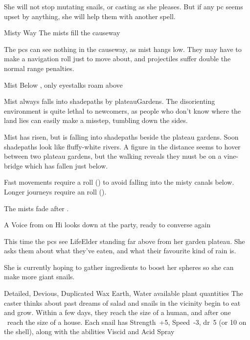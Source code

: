 She will not stop mutating snails, or \gls{casting} as she pleases.
But if any \gls{pc} seems upset by anything, she will help them with another spell.

\LifeElder

\showStdSpells

{Misty Way}%
{The mists fill the causeway}%

The \glspl{pc} can see nothing in the causeway, as mist hangs low.
They may have to make a navigation roll just to move about, and projectiles suffer double the normal range penalties.

{Mist Below}%
{, only eyestalks roam above}%

Mist always falls into \gls{shadepaths} by \gls{plateauGardens}.
The disorienting environment is quite lethal to newcomers, as people who don't know where the land lies can easily make a misstep, tumbling down the sides.

\begin{boxtext}
  Mist has risen, but is falling into \gls{shadepaths} beside the plateau gardens.
  Soon \gls{shadepaths} look like fluffy-white rivers.
  A figure in the distance seems to hover between two plateau gardens, but the walking reveals they must be on a vine-bridge which has fallen just below.
\end{boxtext}

Fast movements require a  roll (\tn[8]) to avoid falling into the misty canals below.
Longer journeys require an  roll (\tn[10]).

The mists fade after .

{A Voice from on Hi}%
{ looks down at the party, ready to converse again}%

This time the \glspl{pc} see \gls{LifeElder} standing far above from her garden plateau.
She asks them about what they've eaten, and what their favourite kind of rain is.

She is currently hoping to gather \glspl{ingredient} to boost her \glspl{sphere} so she can make more giant snails.

  {Detailed, Devious, Duplicated}%
  {Wax}%
  {Earth, Water}%
  {available plant quantities}%
  {The caster thinks about past dreams of salad and  snails in the vicinity begin to eat and grow.
  Within a few days, they reach the size of a human, and after one \showOnset\ reach the size of a house.
  Each snail has Strength~+5, Speed~-3, \gls{dr}~5 (or 10 on the shell), along with the abilities Viscid and Acid Spray}%
  {}

